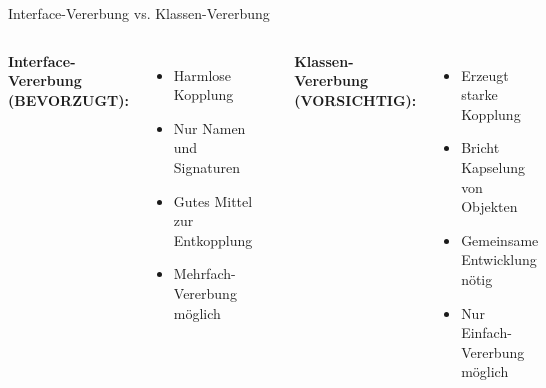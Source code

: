 \begin{frame}[fragile]{Interface-Vererbung vs. Klassen-Vererbung}
  \begin{columns}[T]
    \textbf{Interface-Vererbung (BEVORZUGT):}
    \begin{itemize}
      \item Harmlose Kopplung
      \item Nur Namen und Signaturen
      \item Gutes Mittel zur Entkopplung
      \item Mehrfach-Vererbung möglich
    \end{itemize}
    \begin{lstlisting}[style=java, basicstyle=\tiny\ttfamily]
interface Drawable { void draw(); }
interface Movable { void move(int dx, int dy); }

class GameCharacter
        implements Drawable, Movable {
    @Override
    public void draw() { /* ... */ }
    @Override
    public void move(int dx, int dy) { /* ... */ }
}
    \end{lstlisting}
    \textbf{Klassen-Vererbung (VORSICHTIG):}
    \begin{itemize}
      \item Erzeugt starke Kopplung
      \item Bricht Kapselung von Objekten
      \item Gemeinsame Entwicklung nötig
      \item Nur Einfach-Vererbung möglich
    \end{itemize}
    \begin{lstlisting}[style=java, basicstyle=\tiny\ttfamily]
abstract class Vehicle {
    protected int speed = 0;
    public void accelerate() {
        speed += 10;
    }
    public abstract void startEngine();
}

class Car extends Vehicle {
    @Override
    public void startEngine() { /* ... */ }
    public void brake() {
        speed -= 15;
    }
}
    \end{lstlisting}
  \end{columns}
\end{frame}

